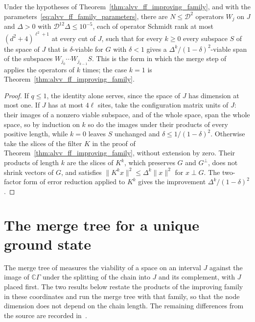 \begin{lemma}
    \label{lem:alvv_ff_improving_family_words}
    \leanok
    Under the hypotheses of Theorem~\ref{thm:alvv_ff_improving_family}, and with
    the parameters~\eqref{eq:alvv_ff_family_parameters}, there are
    $N\le\mathcal D^2$ operators $W_j$ on $J$ and $\Delta>0$ with
    $\mathcal D^{12}\Delta\le10^{-5}$, each of operator Schmidt rank at most
    $(d^2+4)^{\ell^2+1}$ at every cut of $J$, such that for every $k\ge0$ every
    subspace $S$ of the space of $J$ that is $\delta$-viable for $G$ with
    $\delta<1$ gives a $\Delta^k/(1-\delta)^2$-viable span of the subspaces
    $W_{j_0}\cdots W_{j_{k-1}}S$. This is the form in which the merge step
    of~\cite[lines 1662--1677]{Arad2016RigorousRG} applies the operators of
    \cite[Theorem~5.15]{Arad2016RigorousRG} $k$ times; the case $k=1$ is
    Theorem~\ref{thm:alvv_ff_improving_family}.
\end{lemma}
\begin{proof}\leanok
    If $q\le1$, the identity alone serves, since the space of $J$ has dimension
    at most one. If $J$ has at most $4\ell$ sites, take the configuration matrix
    units of $J$: their images of a nonzero viable subspace, and of the whole
    space, span the whole space, so by induction on $k$ so do the images under
    their products of every positive length, while $k=0$ leaves $S$ unchanged and
    $\delta\le1/(1-\delta)^2$. Otherwise take the slices of the filter $K$ in the
    proof of Theorem~\ref{thm:alvv_ff_improving_family}, without extension by
    zero. Their products of length $k$ are the slices of $K^k$, which preserves
    $G$ and $G^\perp$, does not shrink vectors of $G$, and satisfies
    $\|K^kx\|^2\le\Delta^k\|x\|^2$ for $x\perp G$. The two-factor form of error
    reduction applied to $K^k$ gives the improvement $\Delta^k/(1-\delta)^2$.
\end{proof}

\section{The merge tree for a unique ground state}

The merge tree of \cite[Theorem~\texttt{t:unique}, lines
    1829--1855]{Arad2016RigorousRG} measures the viability of a space on an
interval $J$ against the image of $\mathbb C\Gamma$ under the splitting of the
chain into $J$ and its complement, with $J$ placed first. The two results below
restate the products of the improving family in these coordinates and run the
merge tree with that family, so that the node dimension does not depend on the
chain length. The remaining differences from the source are recorded
in~\cite{gap:alvv16_unique_ground_state_tree}.

